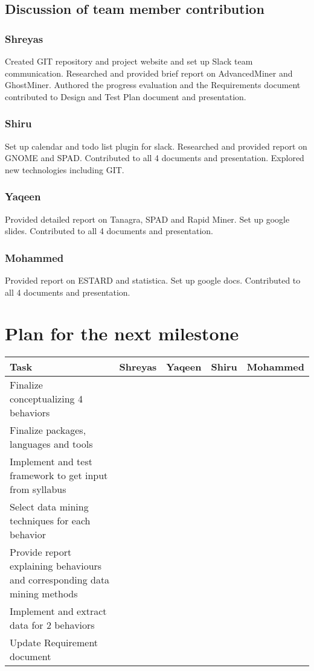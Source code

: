 \documentclass[12pt]{article}
\begin{document}
	\subsection{Discussion of team member contribution}
	\subsubsection{Shreyas}
	Created GIT repository and project website and set up Slack team communication. Researched and provided brief report on AdvancedMiner and GhostMiner. Authored the progress evaluation and the Requirements document contributed to Design and Test Plan document and presentation.
	\subsubsection{Shiru}
	Set up calendar and todo list plugin for slack. Researched and provided report on GNOME and SPAD. Contributed to all 4 documents and presentation. Explored new technologies including GIT. 
	\subsubsection{Yaqeen}
	Provided detailed report on Tanagra, SPAD and Rapid Miner. Set up google slides. Contributed to all 4 documents and presentation.
	\subsubsection{Mohammed}
	Provided report on ESTARD and statistica. Set up google docs. Contributed to all 4 documents and presentation.
	
	\section{Plan for the next milestone}
	\begin{tabularx}{\linewidth}{|X|X|X|X|X|}
	\hline
		\textbf{Task} & \textbf{Shreyas} & \textbf{Yaqeen} & \textbf{Shiru} & \textbf{Mohammed} \\
		\hline
		Finalize conceptualizing 4 behaviors & & & & \\ \hline
		Finalize packages, languages and tools & & & & \\ \hline
		Implement and test framework to get input from syllabus & & & & \\ \hline
		Select data mining techniques for each behavior & & & & \\ \hline
		Provide report explaining behaviours and corresponding data mining methods & & & & \\ \hline
		Implement and extract data for 2 behaviors & & & & \\ \hline
		Update Requirement document & & & & \\ 
		\hline
	\end{tabularx}
\end{document}
